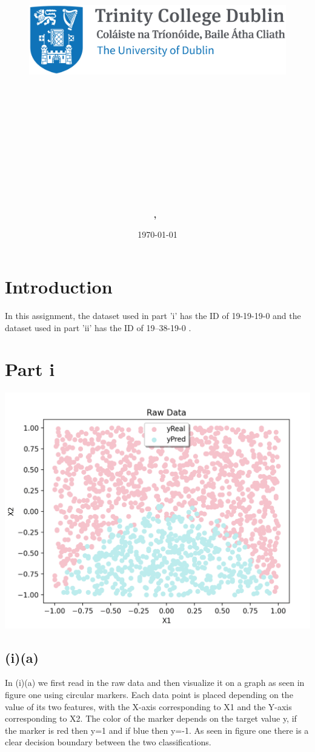 \documentclass{article}
\title{
\vspace{-1in}
\begin{figure}[!ht]
\flushleft
\includegraphics[width=0.4\linewidth]{reduced-trinity.png}
\end{figure}
\vspace{-0.5cm}
\hrulefill \\
\vspace{0.5cm}
\textmd{\textbf{\moduleCode\ \moduleName}}\\
\textmd{\textbf{\assignmentTitle}}\\
\vspace{0.5cm}
\hrulefill \\
}
\author{\textbf{\authorName,\ \authorID}}
\date{\today}
\begin{document}
\captionsetup{width=.8\linewidth} 

\maketitle


\section{Introduction}
In this assignment, the dataset used in part 'i' has the ID of 19-19-19-0 and the dataset used in part 'ii' has the ID of 19--38-19-0 .

\section{Part i }
\begin{center}
\includegraphics[width=.6\linewidth]{data1.png}
\end{center}

\subsection{(i)(a)}
In (i)(a) we first read in the raw data and then visualize it on a graph as seen in figure one using circular markers. Each data point is placed depending on the value of its two features, with the X-axis corresponding to X1 and the Y-axis corresponding to X2. The color of the marker depends on the target value y, if the marker is red then y=1 and if blue then y=-1. As seen in figure one there is a clear decision boundary between the two classifications.
\end{document}
